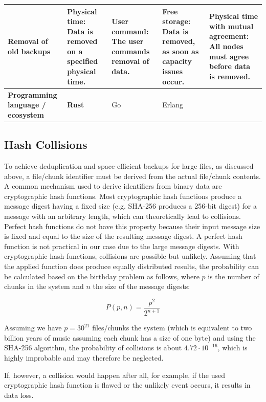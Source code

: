 \begin{table}
\begin{tabu}{X | X X X X}
          \textbf{Removal of old backups}
          & \textbf{Physical time}: Data is removed on a specified physical time.
          & User command: The user commands removal of data.
          & Free storage: Data is removed, as soon as capacity issues occur.
          & Physical time with mutual agreement: All nodes must agree before data is removed.
          \\ \hline


          \textbf{Programming language / ecosystem}
          & \textbf{Rust}
          & Go
          & Erlang
          & 
          \\ \hline
	\end{tabu}
\end{table}

\subsection{Hash Collisions}\label{sec:hash-collisions}
To achieve deduplication and space-efficient backups for large files, as discussed above, a file/chunk identifier must be derived from the actual file/chunk contents. 
A common mechanism used to derive identifiers from binary data are cryptographic hash functions. Most cryptographic hash functions produce a message digest having a fixed size (e.g. SHA-256\cite{sha-256} produces a 256-bit digest) for a message with an arbitrary length, which can theoretically lead to collisions.
Perfect hash functions do not have this property because their input message size is fixed and equal to the size of the resulting message digest. A perfect hash function is not practical in our case due to the large message digests.
With cryptographic hash functions, collisions are possible but unlikely. Assuming that the applied function does produce equally distributed results, the probability can be calculated based on the birthday problem\cite{birthday-attack} as follows, where $p$ is the number of chunks in the system and $n$ the size of the message digests:

\[
P(p, n) = \frac{p^2}{2^{n+1}}
\]

Assuming we have $p=30^{21}$ files/chunks the system (which is equivalent to two billion years of music assuming each chunk has a size of one byte\cite{seagate-zetabyte}) and using the SHA-256 algorithm, the probability of collisions is about $4.72 \cdot 10^{-16}$, which is highly improbable and may therefore be neglected.

If, however, a collision would happen after all, for example, if the used cryptographic hash function is flawed or the unlikely event occurs, it results in data loss.

